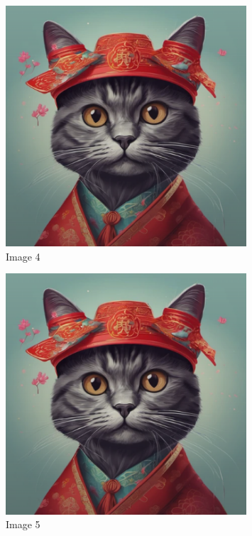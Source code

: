 \documentclass{article}%
\begin{document}
\begin{figure}[h!]%
\centering%
\includegraphics[width=0.8\textwidth]{source/image1.png}%
\caption{Image 4}%
\end{figure}

%


\begin{figure}[h!]%
\centering%
\includegraphics[width=0.8\textwidth]{source/image1.png}%
\caption{Image 5}%
\end{figure}

%
\end{document}
